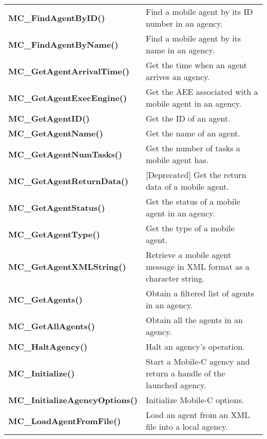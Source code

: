 \begin{table}[!hp]
\begin{center}
\begin{tabular}{p{78 mm}p{77 mm}}
{\bf MC\_FindAgentByID()} \dotfill & Find a mobile agent by its ID number in an agency.\\
{\bf MC\_FindAgentByName()} \dotfill & Find a mobile agent by its name in an agency. \\
{\bf MC\_GetAgentArrivalTime()} \dotfill & Get the time when an agent arrives an agency. \\
{\bf MC\_GetAgentExecEngine()} \dotfill & Get the AEE associated with a mobile agent in an agency. \\
{\bf MC\_GetAgentID()} \dotfill & Get the ID of an agent. \\
{\bf MC\_GetAgentName()} \dotfill & Get the name of an agent. \\
{\bf MC\_GetAgentNumTasks()} \dotfill & Get the number of tasks a mobile agent has. \\
{\bf MC\_GetAgentReturnData()} \dotfill & [Deprecated] Get the return data of a mobile agent. \\
{\bf MC\_GetAgentStatus()} \dotfill & Get the status of a mobile agent in an agency. \\
{\bf MC\_GetAgentType()} \dotfill & Get the type of a mobile agent. \\
{\bf MC\_GetAgentXMLString()} \dotfill & Retrieve a mobile agent message in XML format as a character string. \\
{\bf MC\_GetAgents()} \dotfill & Obtain a filtered list of agents in an agency. \\
{\bf MC\_GetAllAgents()} \dotfill & Obtain all the agents in an agency. \\
{\bf MC\_HaltAgency()} \dotfill & Halt an agency's operation. \\
{\bf MC\_Initialize()} \dotfill & Start a Mobile-C agency and return a handle of the launched agency. \\
{\bf MC\_InitializeAgencyOptions()} \dotfill & Initialize Mobile-C options. \\
{\bf MC\_LoadAgentFromFile()} \dotfill & Load an agent from an XML file into a local agency.\\
\hline
\end{tabular}
\end{center}
\end{table}
\pagebreak

